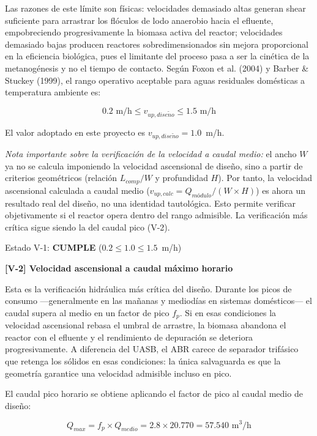 \documentclass[12pt,a4paper]{article}
\begin{document}
Las razones de este límite son físicas: velocidades demasiado altas generan shear suficiente para arrastrar los flóculos de lodo anaerobio hacia el efluente, empobreciendo progresivamente la biomasa activa del reactor; velocidades demasiado bajas producen reactores sobredimensionados sin mejora proporcional en la eficiencia biológica, pues el limitante del proceso pasa a ser la cinética de la metanogénesis y no el tiempo de contacto. Según Foxon et al. (2004) y Barber \& Stuckey (1999), el rango operativo aceptable para aguas residuales domésticas a temperatura ambiente es:

\begin{equation}
0.2 \text{ m/h} \leq v_{up,dise\tilde{n}o} \leq 1.5 \text{ m/h}
\end{equation}

El valor adoptado en este proyecto es $v_{up,dise\tilde{n}o} = 1.0$~m/h.

\textit{Nota importante sobre la verificación de la velocidad a caudal medio:} el ancho $W$ ya no se calcula imponiendo la velocidad ascensional de diseño, sino a partir de criterios geométricos (relación $L_{comp}/W$ y profundidad $H$). Por tanto, la velocidad ascensional calculada a caudal medio ($v_{up,calc} = Q_{módulo} / (W \times H)$) es ahora un resultado real del diseño, no una identidad tautológica. Esto permite verificar objetivamente si el reactor opera dentro del rango admisible. La verificación más crítica sigue siendo la del caudal pico (V-2).

Estado V-1: \textbf{CUMPLE} ($0.2 \leq 1.0 \leq 1.5$~m/h)

\textbf{[V-2] Velocidad ascensional a caudal máximo horario}

Esta es la verificación hidráulica más crítica del diseño. Durante los picos de consumo ---generalmente en las mañanas y mediodías en sistemas domésticos--- el caudal supera al medio en un factor de pico $f_p$. Si en esas condiciones la velocidad ascensional rebasa el umbral de arrastre, la biomasa abandona el reactor con el efluente y el rendimiento de depuración se deteriora progresivamente. A diferencia del UASB, el ABR carece de separador trifásico que retenga los sólidos en esas condiciones: la única salvaguarda es que la geometría garantice una velocidad admisible incluso en pico.

El caudal pico horario se obtiene aplicando el factor de pico al caudal medio de diseño:

\begin{equation}
Q_{max} = f_p \times Q_{medio} = 2.8 \times 20.770 = 57.540 \text{ m}^3\text{/h}
\end{equation}
\end{document}
